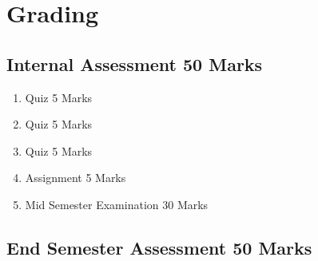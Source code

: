 \section*{Grading}
\subsection*{Internal Assessment \hfill 50 Marks}
\begin{enumerate}
    \item Quiz \hfill 5 Marks
    \item Quiz \hfill 5 Marks
    \item Quiz \hfill 5 Marks
    \item Assignment \hfill 5 Marks
    \item Mid Semester Examination \hfill 30 Marks
\end{enumerate}
\subsection*{End Semester Assessment \hfill 50 Marks}
